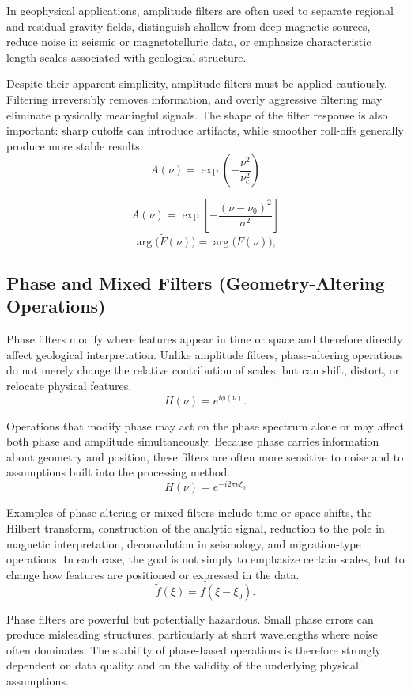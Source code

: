 In geophysical applications, amplitude filters are often used to separate regional and residual gravity fields, distinguish shallow from deep magnetic sources, reduce noise in seismic or magnetotelluric data, or emphasize characteristic length scales associated with geological structure.

Despite their apparent simplicity, amplitude filters must be applied cautiously. Filtering irreversibly removes information, and overly aggressive filtering may eliminate physically meaningful signals. The shape of the filter response is also important: sharp cutoffs can introduce artifacts, while smoother roll-offs generally produce more stable results.
\[
    A(\nu) = \exp\!\left(-\frac{\nu^2}{\nu_c^2}\right)
\]

\[
    A(\nu) =
    \exp\!\left[-\frac{(\nu-\nu_0)^2}{\sigma^2}\right]
\]
\[
    \arg\bigl(\tilde{F}(\nu)\bigr)=\arg\bigl(F(\nu)\bigr),
\]

\subsection{Phase and Mixed Filters (Geometry-Altering Operations)}

Phase filters modify where features appear in time or space and therefore directly affect geological interpretation. Unlike amplitude filters, phase-altering operations do not merely change the relative contribution of scales, but can shift, distort, or relocate physical features.
\[
    H(\nu) = e^{i\phi(\nu)}.
\]

Operations that modify phase may act on the phase spectrum alone or may affect both phase and amplitude simultaneously. Because phase carries information about geometry and position, these filters are often more sensitive to noise and to assumptions built into the processing method.
\[
    H(\nu) = e^{-i2\pi\nu\xi_0}
\]

Examples of phase-altering or mixed filters include time or space shifts, the Hilbert transform, construction of the analytic signal, reduction to the pole in magnetic interpretation, deconvolution in seismology, and migration-type operations. In each case, the goal is not simply to emphasize certain scales, but to change how features are positioned or expressed in the data.
\[
    \tilde{f}(\xi) = f(\xi-\xi_0).
\]

Phase filters are powerful but potentially hazardous. Small phase errors can produce misleading structures, particularly at short wavelengths where noise often dominates. The stability of phase-based operations is therefore strongly dependent on data quality and on the validity of the underlying physical assumptions.

